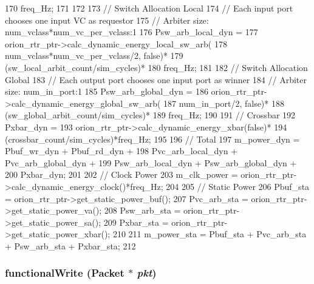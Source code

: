 \begin{DoxyCode}
{{170                     freq_Hz;
171     }
172 
173     // Switch Allocation Local
174     // Each input port chooses one input VC as requestor
175     // Arbiter size: num_vclass*num_vc_per_vclass:1
176     Psw_arb_local_dyn =
177         orion_rtr_ptr->calc_dynamic_energy_local_sw_arb(
178             num_vclass*num_vc_per_vclass/2, false)*
179             (sw_local_arbit_count/sim_cycles)*
180             freq_Hz;
181 
182     // Switch Allocation Global
183     // Each output port chooses one input port as winner
184     // Arbiter size: num_in_port:1
185     Psw_arb_global_dyn =
186         orion_rtr_ptr->calc_dynamic_energy_global_sw_arb(
187             num_in_port/2, false)*
188                 (sw_global_arbit_count/sim_cycles)*
189                 freq_Hz;
190 
191     // Crossbar
192     Pxbar_dyn =
193         orion_rtr_ptr->calc_dynamic_energy_xbar(false)*
194             (crossbar_count/sim_cycles)*freq_Hz;
195 
196     // Total
197     m_power_dyn = Pbuf_wr_dyn + Pbuf_rd_dyn +
198                   Pvc_arb_local_dyn + Pvc_arb_global_dyn +
199                   Psw_arb_local_dyn + Psw_arb_global_dyn +
200                   Pxbar_dyn;
201 
202     // Clock Power
203     m_clk_power = orion_rtr_ptr->calc_dynamic_energy_clock()*freq_Hz;
204 
205     // Static Power
206     Pbuf_sta = orion_rtr_ptr->get_static_power_buf();
207     Pvc_arb_sta = orion_rtr_ptr->get_static_power_va();
208     Psw_arb_sta = orion_rtr_ptr->get_static_power_sa();
209     Pxbar_sta = orion_rtr_ptr->get_static_power_xbar();
210 
211     m_power_sta =  Pbuf_sta + Pvc_arb_sta + Psw_arb_sta + Pxbar_sta;
212 }
\end{DoxyCode}
\hypertarget{classRouter__d_aba9037f662122b5f2e85647d35670e5c}{
\subsubsection[{functionalWrite}]{ functionalWrite ({\bf Packet} $\ast$ {\em pkt})}}
\label{classRouter__d_aba9037f662122b5f2e85647d35670e5c}



